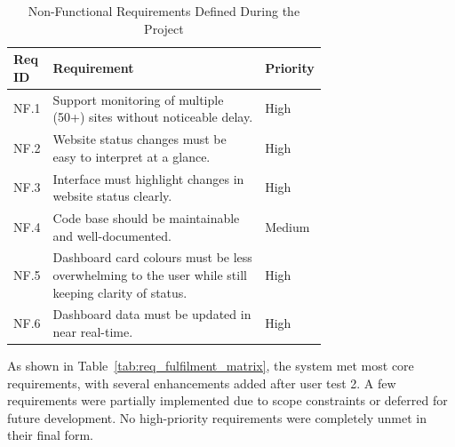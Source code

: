 \begin{table}[H]
\centering
\begin{tabular}{|l|p{0.7\linewidth}|l|}
\hline
\textbf{Req ID} & \textbf{Requirement} & \textbf{Priority} \\ \hline
NF.1  & Support monitoring of multiple (50+) sites without noticeable delay. & High \\ \hline
NF.2  & Website status changes must be easy to interpret at a glance.  & High \\ \hline
NF.3  & Interface must highlight changes in website status clearly. & High \\ \hline
NF.4  & Code base should be maintainable and well-documented. & Medium \\ \hline
NF.5  & Dashboard card colours must be less overwhelming to the user while still keeping clarity of status. & High \\ \hline
NF.6  & Dashboard data must be updated in near real-time. & High \\ \hline
\end{tabular}
\caption{Non-Functional Requirements Defined During the Project}
\label{tab:nonfunctional_requirements_full}
\end{table}

As shown in Table~\ref{tab:req_fulfilment_matrix}, the system met most core requirements, with several enhancements added after user test 2. A few requirements were partially implemented due to scope constraints or deferred for future development. No high-priority requirements were completely unmet in their final form.

